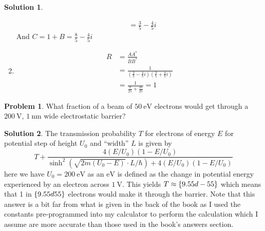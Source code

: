 \documentclass[10pt]{article}
\theoremstyle{definition}
\newtheorem{problem}{Problem}
\newtheorem{soln}{Solution}
\begin{document}
\begin{soln}
\begin{enumerate}[label=(\alph*)]
\begin{align*}
              & =\frac{3}{5}-\frac{4}{5}i
          \end{align*}
          And $C=1+B=\frac{8}{5}-\frac{4}{5}i$
    \item \begin{align*}
            R & =\frac{AA^*}{BB^*}                                                                    \\
              & =\frac{1}{\left(\frac{3}{5}-\frac{4}{5}i\right)\left(\frac{3}{5}+\frac{4}{5}i\right)} \\
              & =\frac{1}{\frac{9}{25}+\frac{16}{25}}=1
          \end{align*}
  \end{enumerate}
\end{soln}

\begin{problem}
What fraction of a beam of $\qty{50}{\electronvolt}$ electrons would get through a $\qty{200}{\volt}$, $\qty{1}{\nano\meter}$ wide electrostatic barrier?
\end{problem}
\begin{soln}
  The transmission probability $T$ for electrons of energy $E$ for potential step of height $U_0$ and ``width'' $L$ is given by
  $$T+\frac{4\left(E/U_0\right)\left(1-E/U_0\right)}{\sinh^2\left(\sqrt{2m\left(U_0-E\right)}\cdot L/\hbar\right)+4\left(E/U_0\right)\left(1-E/U_0\right)}$$
  here we have $U_0=\qty{200}{\electronvolt}$ as an $\unit{\electronvolt}$ is defined as the change in potential energy experienced by an electron across $\qty{1}{\volt}$.
  This yields $T\approx\qty{9.55d-55}{}$ which means that 1 in $\qty{9.55d55}{}$ electrons would make it through the barrier. Note that this answer is a bit far from what is given
  in the back of the book as I used the constants pre-programmed into my calculator to perform the calculation which I assume are more accurate than those used in the book's answers section.
\end{soln}
\end{document}
